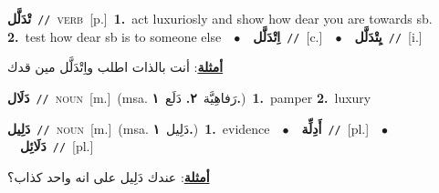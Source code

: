 \documentclass[10pt,a4paper,twoside]{article} %
\begin{document}
\begin{multicols}{2}
{\setlength\topsep{0pt}\textbf{\foreignlanguage{arabic}{تْدَلَّل}}\ {\color{gray}\texttt{//}\color{black}}\ \textsc{verb}\ [p.]\ \textbf{1.}~act luxuriosly and show how dear you are towards sb.  \textbf{2.}~test how dear sb is to someone else\ \ $\bullet$\ \ \setlength\topsep{0pt}\textbf{\foreignlanguage{arabic}{اِتْدَلَّل}}\ {\color{gray}\texttt{//}\color{black}}\ [c.]\ \ $\bullet$\ \ \setlength\topsep{0pt}\textbf{\foreignlanguage{arabic}{يِتْدَلَّل}}\ {\color{gray}\texttt{//}\color{black}}\ [i.]\  \begin{flushright}\color{gray}\foreignlanguage{arabic}{\textbf{\underline{\foreignlanguage{arabic}{أمثلة}}}: أنت بالذات اطلب واِتْدَلَّل مين قدك}\end{flushright}\color{black}} \vspace{2mm}

{\setlength\topsep{0pt}\textbf{\foreignlanguage{arabic}{دَلَال}}\ {\color{gray}\texttt{//}\color{black}}\ \textsc{noun}\ [m.]\ \color{gray}(msa. \foreignlanguage{arabic}{رَفاهِيَّة}~\foreignlanguage{arabic}{\textbf{٢.}}  \foreignlanguage{arabic}{دَلَع}~\foreignlanguage{arabic}{\textbf{١.}})\color{black}\ \textbf{1.}~pamper  \textbf{2.}~luxury\ } \vspace{2mm}

{\setlength\topsep{0pt}\textbf{\foreignlanguage{arabic}{دَلِيل}}\ {\color{gray}\texttt{//}\color{black}}\ \textsc{noun}\ [m.]\ \color{gray}(msa. \foreignlanguage{arabic}{دَلِيل}~\foreignlanguage{arabic}{\textbf{١.}})\color{black}\ \textbf{1.}~evidence\ \ $\bullet$\ \ \setlength\topsep{0pt}\textbf{\foreignlanguage{arabic}{أَدِلِّة}}\ {\color{gray}\texttt{//}\color{black}}\ [pl.]\ \ $\bullet$\ \ \setlength\topsep{0pt}\textbf{\foreignlanguage{arabic}{دَلَائِل}}\ {\color{gray}\texttt{//}\color{black}}\ [pl.]\  \begin{flushright}\color{gray}\foreignlanguage{arabic}{\textbf{\underline{\foreignlanguage{arabic}{أمثلة}}}: عندك دَلِيل على انه واحد كذاب؟}\end{flushright}\color{black}} \vspace{2mm}


\end{multicols}
\end{document}

